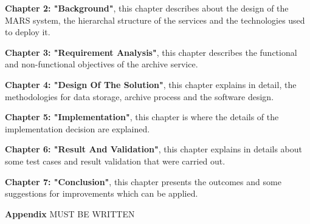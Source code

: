         \par
        \textbf{Chapter 2: "Background"}, this chapter describes about the design
        of the MARS system, the hierarchal structure of the services and the technologies used to
        deploy it.

        \par
        \textbf{Chapter 3: "Requirement Analysis"}, this chapter describes the functional and
        non-functional objectives of the archive service.

        \par
        \textbf{Chapter 4: "Design Of The Solution"}, this chapter explains in detail, the 
        methodologies for data storage, archive process and the software design.

        \par
        \textbf{Chapter 5: "Implementation"}, this chapter is where the details of the 
        implementation decision are explained.

        \par
        \textbf{Chapter 6: "Result And Validation"}, this chapter explains in details about 
        some test cases and result validation that were carried out.

        \par
        \textbf{Chapter 7: "Conclusion"}, this chapter presents the outcomes and some 
        suggestions for improvements which can be applied.
        
        \par
        \textbf{Appendix}
        MUST BE WRITTEN

